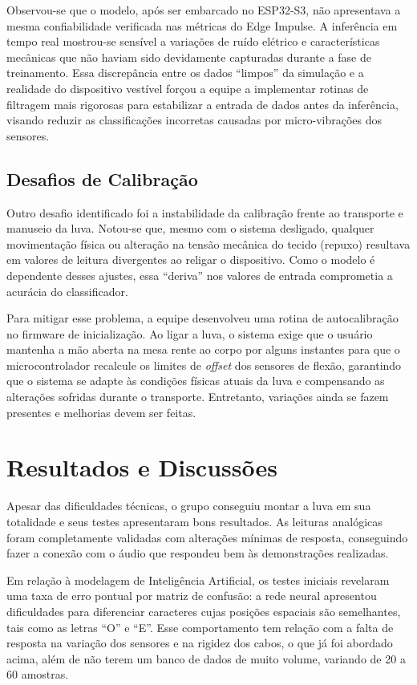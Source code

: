 \documentclass[12pt,a4paper]{article}
\begin{document}
Observou-se que o modelo, após ser embarcado no ESP32-S3, não apresentava a mesma confiabilidade verificada nas métricas do Edge Impulse. A inferência em tempo real mostrou-se sensível a variações de ruído elétrico e características mecânicas que não haviam sido devidamente capturadas durante a fase de treinamento. Essa discrepância entre os dados ``limpos'' da simulação e a realidade do dispositivo vestível forçou a equipe a implementar rotinas de filtragem mais rigorosas para estabilizar a entrada de dados antes da inferência, visando reduzir as classificações incorretas causadas por micro-vibrações dos sensores.

\subsection{Desafios de Calibração}

Outro desafio identificado foi a instabilidade da calibração frente ao transporte e manuseio da luva. Notou-se que, mesmo com o sistema desligado, qualquer movimentação física ou alteração na tensão mecânica do tecido (repuxo) resultava em valores de leitura divergentes ao religar o dispositivo. Como o modelo é dependente desses ajustes, essa ``deriva'' nos valores de entrada comprometia a acurácia do classificador.

Para mitigar esse problema, a equipe desenvolveu uma rotina de autocalibração no firmware de inicialização. Ao ligar a luva, o sistema exige que o usuário mantenha a mão aberta na mesa rente ao corpo por alguns instantes para que o microcontrolador recalcule os limites de \textit{offset} dos sensores de flexão, garantindo que o sistema se adapte às condições físicas atuais da luva e compensando as alterações sofridas durante o transporte. Entretanto, variações ainda se fazem presentes e melhorias devem ser feitas.

\section{Resultados e Discussões}

Apesar das dificuldades técnicas, o grupo conseguiu montar a luva em sua totalidade e seus testes apresentaram bons resultados. As leituras analógicas foram completamente validadas com alterações mínimas de resposta, conseguindo fazer a conexão com o áudio que respondeu bem às demonstrações realizadas.

Em relação à modelagem de Inteligência Artificial, os testes iniciais revelaram uma taxa de erro pontual por matriz de confusão: a rede neural apresentou dificuldades para diferenciar caracteres cujas posições espaciais são semelhantes, tais como as letras “O” e “E”. Esse comportamento tem relação com a falta de resposta na variação dos sensores e na rigidez dos cabos, o que já foi abordado acima, além de não terem um banco de dados de muito volume, variando de 20 a 60 amostras.
\end{document}
